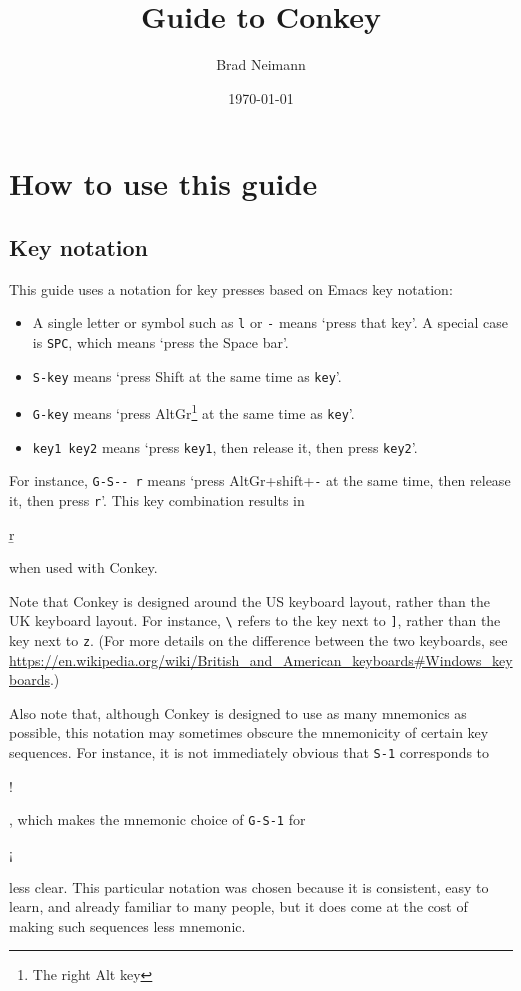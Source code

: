 \documentclass[oneside]{memoir}
\title{Guide to Conkey}
\author{Brad Neimann}
\date{\today}
\newcommand{\key}{\verb}
\newcommand{\out}[1]{\colorbox{gray!20}{\strut{}#1}}
\begin{document}
\maketitle

\tableofcontents

\listoftables

\chapter{How to use this guide}
\label{sec:how_to_use}

\section{Key notation}
\label{sec:key_notation}

This guide uses a notation for key presses based on Emacs key notation:

\begin{itemize}
\item A single letter or symbol such as \key|l| or \key|-| means `press that key'. A special case is \key|SPC|, which means `press the Space bar'.
\item \key|S-key| means `press Shift at the same time as \key|key|'.
\item \key|G-key| means `press AltGr\footnote{The right Alt key} at the same time as \key|key|'.
\item \key|key1 key2| means `press \key|key1|, then release it, then press \key|key2|'.
\end{itemize}

For instance, \key|G-S-- r| means `press AltGr+shift+\key|-| at the same time, then release it, then press \key|r|'.
This key combination results in \out{ṟ} when used with Conkey.

Note that Conkey is designed around the US keyboard layout, rather than the UK keyboard layout.
For instance, \key|\| refers to the key next to \key|]|, rather than the key next to \key|z|.
(For more details on the difference between the two keyboards, see \url{https://en.wikipedia.org/wiki/British_and_American_keyboards#Windows_keyboards}.)

Also note that, although Conkey is designed to use as many mnemonics as possible,
  this notation may sometimes obscure the mnemonicity of certain key sequences.
For instance, it is not immediately obvious that \key|S-1| corresponds to \out{!},
  which makes the mnemonic choice of \key|G-S-1| for \out{¡} less clear.
This particular notation was chosen because it is consistent, easy to learn, and already familiar to many people,
  but it does come at the cost of making such sequences less mnemonic.
\end{document}
